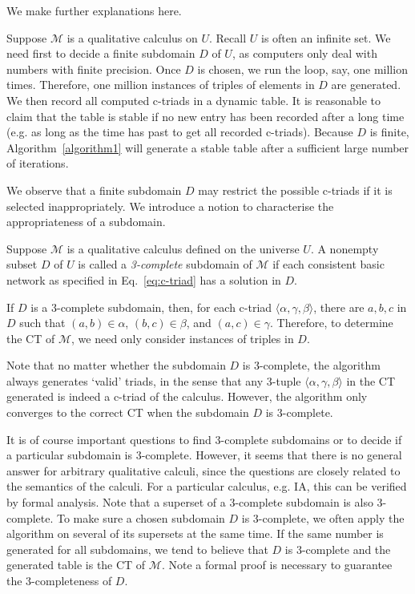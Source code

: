 \documentclass{llncs}
\newcommand{\qcm}{\mathcal{M}}
\begin{document}
We make further explanations here.

Suppose $\qcm$ is a qualitative calculus on $U$. Recall $U$ is often an infinite set. We need first to decide a finite subdomain $D$ of $U$, as computers only deal with numbers with finite precision.  Once $D$ is chosen, we run the loop, say, one million times. Therefore, one million instances of triples of elements in $D$ are generated. We then record all computed c-triads in a dynamic table. It is reasonable to claim that the table is stable if no new entry has been recorded after a long time (e.g. as long as the time has past to get all recorded c-triads).  Because $D$ is finite, Algorithm~\ref{algorithm1} will generate a stable table after  a sufficient large number of iterations.

We observe that a finite subdomain $D$ may restrict the possible c-triads if it is selected inappropriately. We introduce a notion to characterise the appropriateness of a subdomain.

\begin{definition}\label{dfn:complete-subdomain}
Suppose $\qcm$ is a qualitative calculus defined on the universe $U$. A nonempty subset $D$ of $U$ is called a \emph{3-complete} subdomain of $\qcm$ if each consistent basic network as specified in Eq.~\ref{eq:c-triad} has a solution in $D$.
\end{definition}
If  $D$ is a  3-complete subdomain, then, for each c-triad $\langle\alpha,\gamma,\beta\rangle$, there are $a,b,c$ in $D$ such that $(a,b)\in \alpha$,  $(b,c)\in\beta$, and $(a,c)\in\gamma$. Therefore, to determine the CT of $\qcm$, we need only consider instances of triples in $D$.

Note that no matter whether the subdomain $D$ is 3-complete, the algorithm always generates `valid' triads, in the sense that any 3-tuple $\langle\alpha,\gamma,\beta\rangle$ in the CT generated is indeed a c-triad of the calculus. However, the algorithm only converges to the correct CT when the subdomain $D$ is 3-complete.

It is of course important questions to find 3-complete subdomains or to decide if a particular subdomain is 3-complete.
However, it seems that there is no general answer for arbitrary qualitative calculi, since the questions are closely related to the semantics of the calculi. For a particular calculus, e.g. IA, this can be verified by formal analysis. Note that a superset of a 3-complete subdomain is also 3-complete. To make sure a chosen subdomain $D$ is 3-complete, we often apply the algorithm on several of its supersets at the same time. If the same number is generated for all subdomains, we tend to believe that $D$ is 3-complete and the generated table is the CT of $\qcm$. Note a formal proof is necessary to guarantee the 3-completeness of $D$.
\end{document}
